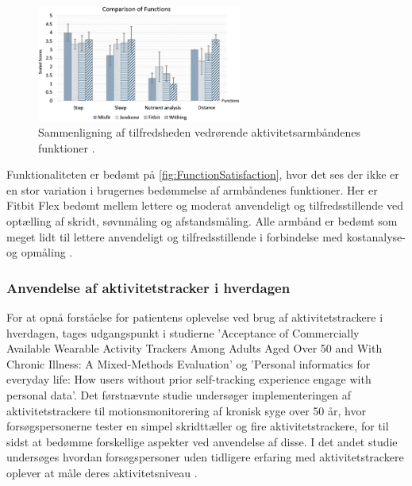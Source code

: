 \begin{figure}[H]
	\centering
	\includegraphics[width=0.6\textwidth]{figures/FunctionSatisfaction}
	\caption{Sammenligning af tilfredsheden vedrørende aktivitetsarmbåndenes funktioner \citep{kaewkannate2016}.}
	\label{fig:FunctionSatisfaction}
\end{figure}

Funktionaliteten er bedømt på \autoref{fig:FunctionSatisfaction}, hvor det ses der ikke er en stor variation i brugernes bedømmelse af armbåndenes funktioner. Her er Fitbit Flex bedømt mellem lettere og moderat anvendeligt og tilfredsstillende ved optælling af skridt, søvnmåling og afstandsmåling. Alle armbånd er bedømt som meget lidt til lettere anvendeligt og tilfredsstillende i forbindelse med kostanalyse- og opmåling \citep{kaewkannate2016}.

\subsubsection{Anvendelse af aktivitetstracker i hverdagen}

For at opnå forståelse for patientens oplevelse ved brug af aktivitetstrackere i hverdagen, tages udgangspunkt i studierne 'Acceptance of Commercially Available Wearable Activity Trackers Among Adults Aged Over 50 and With Chronic Illness: A Mixed-Methods Evaluation' og 'Personal informatics for everyday life: How users without prior self-tracking experience engage with personal data'. Det førstnævnte studie undersøger implementeringen af aktivitetstrackere til motionsmonitorering af kronisk syge over 50 år, hvor forsøgspersonerne tester en simpel skridttæller og fire aktivitetstrackere, for til sidst at bedømme forskellige aspekter ved anvendelse af disse. I det andet studie undersøges hvordan forsøgspersoner uden tidligere erfaring med aktivitetstrackere oplever at måle deres aktivitetsniveau \citep{mercer2016, rapp2016}.

